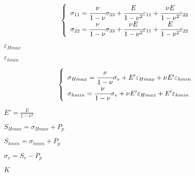 \documentclass[onecolumn,11pt]{report}
\def\lthtmlcheckvsize{\ifdim\ht\sizebox<\vsize 
  \ifdim\wd\sizebox<\hsize\expandafter\hfill\fi \expandafter\vfill
  \else\expandafter\vss\fi}%
\begin{document}
{\newpage\clearpage
{}%
\begin{displaymath}\left\lbrace
\begin{array}{l}
\sigma_{11} =
\cfrac{\nu}{1-\nu} \sigma_{33} +
\cfrac{E}{1-\nu^2} \varepsilon_{11} +
\cfrac{\nu E}{1-\nu^2} \varepsilon_{22} \\
\sigma_{22} =
\cfrac{\nu}{1-\nu} \sigma_{33} +
\cfrac{\nu E}{1-\nu^2} \varepsilon_{11} +
\cfrac{E}{1-\nu^2} \varepsilon_{22} \\
\end{array}
\right.\end{displaymath}%
\lthtmldisplayZ
\lthtmlcheckvsize\clearpage}

{\newpage\clearpage
{}%
$ \varepsilon_{Hmax}$%
\lthtmlindisplaymathZ
\lthtmlcheckvsize\clearpage}

{\newpage\clearpage
{}%
$ \varepsilon_{hmin}$%
\lthtmlindisplaymathZ
\lthtmlcheckvsize\clearpage}

{\newpage\clearpage
{}%
\begin{displaymath}\left\lbrace
\begin{array}{l}
\sigma_{Hmax} =  \cfrac{\nu}{1-\nu} \sigma_{v} +
E' \varepsilon_{Hmax} +
\nu E'\varepsilon_{hmin}  \\
\sigma_{hmin} =  \cfrac{\nu}{1-\nu} \sigma_{v} +
\nu E' \varepsilon_{Hmax} +
E' \varepsilon_{hmin} \\
\end{array}
\right.\end{displaymath}%
\lthtmldisplayZ
\lthtmlcheckvsize\clearpage}

{\newpage\clearpage
{}%
$ E' = \frac{E}{1-\nu^2}$%
\lthtmlindisplaymathZ
\lthtmlcheckvsize\clearpage}

{\newpage\clearpage
{}%
$ S_{Hmax} = \sigma_{Hmax} + P_p$%
\lthtmlindisplaymathZ
\lthtmlcheckvsize\clearpage}

{\newpage\clearpage
{}%
$ S_{hmin} = \sigma_{hmin} + P_p$%
\lthtmlindisplaymathZ
\lthtmlcheckvsize\clearpage}

{\newpage\clearpage
{}%
$ \sigma_{v} = S_{v} - P_p$%
\lthtmlindisplaymathZ
\lthtmlcheckvsize\clearpage}

{\newpage\clearpage
{}%
$ K$%
\lthtmlindisplaymathZ
\lthtmlcheckvsize\clearpage}
\end{document}
